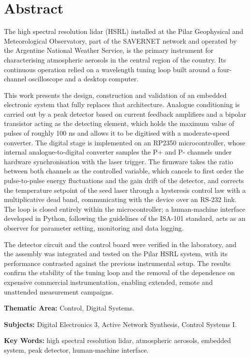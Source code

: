 \chapter*{Abstract}
{}

The high spectral resolution lidar (HSRL) installed at the Pilar Geophysical and Meteorological Observatory, part of the SAVERNET network and operated by the Argentine National Weather Service, is the primary instrument for characterising atmospheric aerosols in the central region of the country. Its continuous operation relied on a wavelength tuning loop built around a four-channel oscilloscope and a desktop computer.

This work presents the design, construction and validation of an embedded electronic system that fully replaces that architecture. Analogue conditioning is carried out by a peak detector based on current feedback amplifiers and a bipolar transistor acting as the detecting element, which holds the maximum value of pulses of roughly 100 ns and allows it to be digitised with a moderate-speed converter. The digital stage is implemented on an RP2350 microcontroller, whose internal analogue-to-digital converter samples the P+ and P- channels under hardware synchronisation with the laser trigger. The firmware takes the ratio between both channels as the controlled variable, which cancels to first order the pulse-to-pulse energy fluctuations and the gain drift of the detector, and corrects the temperature setpoint of the seed laser through a hysteresis control law with a multiplicative dead band, communicating with the device over an RS-232 link. The loop is closed entirely within the microcontroller; a human-machine interface developed in Python, following the guidelines of the ISA-101 standard, acts as an observer for parameter setting, monitoring and data logging.

The detector circuit and the control board were verified in the laboratory, and the assembly was integrated and tested on the Pilar HSRL system, with its performance contrasted against the previous instrumental setup. The results confirm the stability of the tuning loop and the removal of the dependence on expensive commercial instrumentation, enabling extended, remote and unattended measurement campaigns.

\vspace{1cm}
\noindent\textbf{Thematic Area:} Control, Digital Systems.

\noindent\textbf{Subjects:} Digital Electronics 3, Active Network
Synthesis, Control Systems I.

\noindent\textbf{Key Words:} high spectral resolution lidar, atmospheric aerosols, embedded system, peak detector, human-machine interface.

\cleardoublepage

